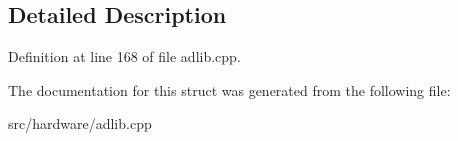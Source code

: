 \subsection{Detailed Description}


Definition at line 168 of file adlib.\-cpp.



The documentation for this struct was generated from the following file\-:\begin{DoxyCompactItemize}
\item 
src/hardware/adlib.\-cpp\end{DoxyCompactItemize}
